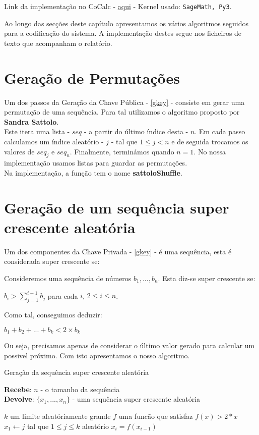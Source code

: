 \documentclass[11pt, language=portuguese]{report}
\begin{document}
Link da implementação no CoCalc - \href{https://cocalc.com/share/1bede121-9d2a-477f-be2c-1dea8a3a05a6/Merkle-Hellman%20knapsack.ipynb?viewer=share}{aqui} - Kernel usado: \texttt{SageMath, Py3}.

Ao longo das secções deste capítulo apresentamos os vários algoritmos seguidos para a codificação do sistema.
A implementação destes segue nos ficheiros de texto que acompanham o relatório.

\section{Geração de Permutações}
\label{perm}

Um dos passos da Geração da Chave Pública - \ref{gkey} - consiste em gerar uma permutação de uma sequência. Para tal utilizamos o algoritmo proposto por \textbf{Sandra Sattolo}\autocite{sattolo}.\\
Este itera uma lista - $seq$ - a partir do último índice desta - $n$. Em cada passo calculamos um índice aleatório - $j$ - tal que $1 \le j < n$ e de seguida trocamos os valores de $seq_j$ e $seq_n$. Finalmente, terminámos quando $n = 1$. No nossa implementação usamos listas para guardar as permutações.\\
Na implementação, a função tem o nome \textbf{sattoloShuffle}.

\section{Geração de um sequência super crescente aleatória}
\label{seq}

Um dos componentes da Chave Privada - \ref{gkey} - é uma sequência, esta é considerada super crescente se:\\
\begin{definition}
	Consideremos uma sequência de números ${b_1, ..., b_n}$. Esta diz-se super crescente se:
	\begin{center}
		$b_i > \sum_{j = 1}^{i - 1} b_j$ para cada $i$, $2 \le i \le n$. 
	\end{center}
\end{definition}

Como tal, conseguimos deduzir:

\begin{center}
	$b_1 + b_2 + ... + b_k < 2 \times b_k$
\end{center}

Ou seja, precisamos apenas de considerar o último valor gerado para calcular um possivel próximo.
Com isto apresentamos o nosso algoritmo.
\begin{algorithm}[H]
	\caption{Geração da sequência super crescente aleatória}
	\textbf{Recebe}: $n$ - o tamanho da sequência\\
	\textbf{Devolve}: $\{x_1, ..., x_n\}$ - uma sequência super crescente aleatória
	\begin{algorithmic}[1]
		\State $k$ um limite aleatóriamente grande
		\State $f$ uma funcão que satisfaz $f(x) > 2 * x$
		\State $x_1 \gets j$ tal que $1 \le j \le k$ aleatório
			\State $x_i = f(x_{i-1})$
		\EndFor
	\end{algorithmic}
\end{algorithm}
\end{document}
